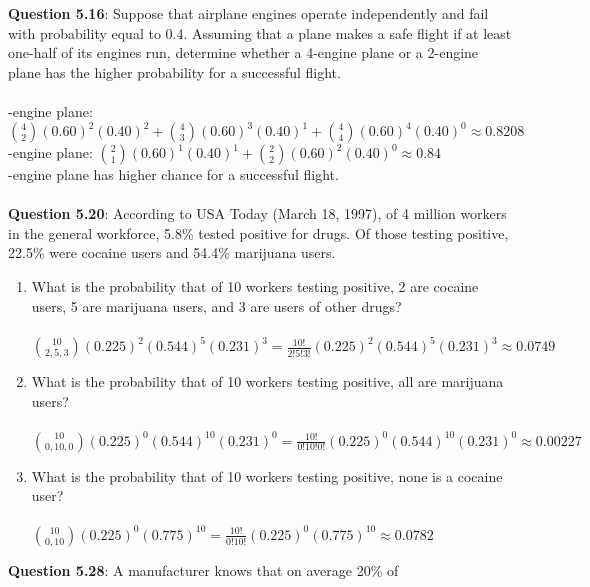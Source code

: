 \documentclass{article}
\begin{document}
    \textbf{Question 5.16}: Suppose that airplane engines operate independently 
    and fail with probability equal to 0.4. Assuming
    that a plane makes a safe flight if at least one-half of its
    engines run, determine whether a 4-engine plane or a 2-engine 
    plane has the higher probability for a successful
    flight.\\\\
        -engine plane:
        \indent $\binom{4}{2}(0.60)^{2}(0.40)^{2} + \binom{4}{3}(0.60)^{3}(0.40)^{1} + \binom{4}{4}(0.60)^{4}(0.40)^{0} \approx 0.8208$\\
        -engine plane:
        \indent $\binom{2}{1}(0.60)^{1}(0.40)^{1} + \binom{2}{2}(0.60)^{2}(0.40)^{0} \approx 0.84$\\
        -engine plane has higher chance for a successful flight.\\\\
    \textbf{Question 5.20}: According to USA Today (March 18, 1997), of 4
    million workers in the general workforce, 5.8\% tested
    positive for drugs. Of those testing positive, 22.5\%
    were cocaine users and 54.4\% marijuana users.
        \begin{enumerate}[label = (\alph*)]
            \item What is the probability that of 10 workers testing
            positive, 2 are cocaine users, 5 are marijuana users,
            and 3 are users of other drugs?\\\\
                \indent $\binom{10}{2,5,3}(0.225)^{2}(0.544)^{5}(0.231)^{3} = \frac{10!}{2!5!3!}(0.225)^{2}(0.544)^{5}(0.231)^{3} \approx 0.0749$
            \item What is the probability that of 10 workers testing
            positive, all are marijuana users?\\\\
                \indent $\binom{10}{0,10,0}(0.225)^{0}(0.544)^{10}(0.231)^{0} = \frac{10!}{0!10!0!}(0.225)^{0}(0.544)^{10}(0.231)^{0} \approx 0.00227$
            \item What is the probability that of 10 workers testing
            positive, none is a cocaine user?\\\\
                \indent $\binom{10}{0,10}(0.225)^{0}(0.775)^{10} = \frac{10!}{0!10!}(0.225)^{0}(0.775)^{10} \approx 0.0782$
        \end{enumerate}
    \textbf{Question 5.28}: A manufacturer knows that on average 20\% of
\end{document}
